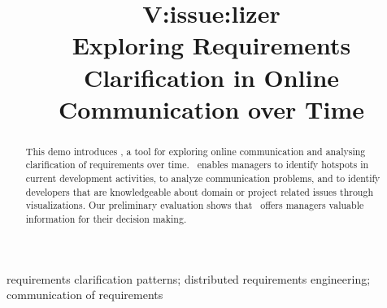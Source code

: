 
\title{V:issue:lizer\\Exploring Requirements Clarification in Online Communication over Time}


\author{
}

\maketitle


\begin{abstract}
This demo introduces \viss, a tool for exploring online communication and analysing clarification of requirements over time.
\viss\ enables managers to identify hotspots in current development activities, to analyze communication problems, and to identify developers that are knowledgeable about domain or project related issues through visualizations.
Our preliminary evaluation shows that \viss\ offers managers valuable information for their decision making.
\end{abstract}

\begin{IEEEkeywords}
requirements clarification patterns; distributed requirements engineering; communication of requirements
\end{IEEEkeywords}
